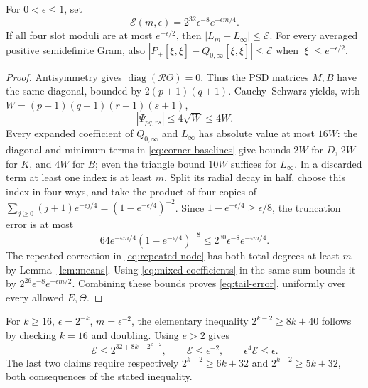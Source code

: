 \begin{lemma}\label{lem:tails} For \(0<\epsilon\le1\), set
\begin{equation}
 \mathcal E(m,\epsilon)=2^{32}\epsilon^{-8}e^{-\epsilon m/4}.
                                                               \label{eq:tail-error}
\end{equation}
If all four slot moduli are at most \(e^{-\epsilon/2}\), then
\(|L_m-L_\infty|\le\mathcal E\). For every averaged positive semidefinite Gram, also
\(|P_+[\xi,\bar \xi]-Q_{0,\infty}[\xi,\bar \xi]|\le\mathcal E\)
when \(|\xi|\le e^{-\epsilon/2}\).

\end{lemma}
\begin{proof} Antisymmetry gives \(\operatorname{diag}(\mathcal R\Theta)=0\).
Thus the PSD matrices \(M,B\) have the same diagonal, bounded by
\(2(p+1)(q+1)\). Cauchy–Schwarz yields, with
\(W=(p+1)(q+1)(r+1)(s+1)\),
\begin{equation}
 |\Psi_{pq,rs}|\le4\sqrt W\le4W.             \label{eq:mixed-coefficients}
\end{equation}
Every expanded coefficient of \(Q_{0,\infty}\) and \(L_\infty\) has
absolute value at most \(16W\): the diagonal and minimum terms in \eqref{eq:corner-baselines}
give bounds \(2W\) for \(D\), \(2W\) for \(K\), and \(4W\) for \(B\);
even the triangle bound \(10W\) suffices for \(L_\infty\). In a discarded term at least one index
is at least \(m\). Split its radial decay in half, choose this index in
four ways, and take the product of four copies of
\(\sum_{j\ge0}(j+1)e^{-\epsilon j/4}=(1-e^{-\epsilon/4})^{-2}\).
Since \(1-e^{-\epsilon/4}\ge\epsilon/8\), the truncation error is at most
\begin{equation}
 64e^{-\epsilon m/4}(1-e^{-\epsilon/4})^{-8}
                  \le2^{30}\epsilon^{-8}e^{-\epsilon m/4}.       \label{eq:baseline-tail}
\end{equation}
The repeated correction in \eqref{eq:repeated-node} has both total degrees at least \(m\)
by Lemma~\ref{lem:means}. Using \eqref{eq:mixed-coefficients} in the same sum bounds it by
\(2^{26}\epsilon^{-8}e^{-\epsilon m/2}\). Combining these bounds proves
\eqref{eq:tail-error}, uniformly over every allowed \(E,\Theta\). \end{proof}

For \(k\ge16\), \(\epsilon=2^{-k}\), \(m=\epsilon^{-2}\), the elementary
inequality \(2^{k-2}\ge8k+40\) follows by checking \(k=16\) and doubling.
Using \(e>2\) gives
\begin{equation}
 \mathcal E\le2^{32+8k-2^{k-2}},\qquad
 \mathcal E\le\epsilon^{-2},\qquad
                    \epsilon^4\mathcal E\le\epsilon.   \label{eq:dyadic-tail-budget}
\end{equation}
The last two claims require respectively \(2^{k-2}\ge6k+32\) and
\(2^{k-2}\ge5k+32\), both consequences of the stated inequality.
